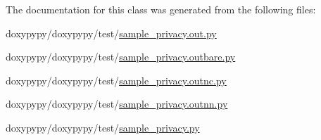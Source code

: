 The documentation for this class was generated from the following files\-:\begin{DoxyCompactItemize}
\item 
doxypypy/doxypypy/test/\hyperlink{sample__privacy_8out_8py}{sample\-\_\-privacy.\-out.\-py}\item 
doxypypy/doxypypy/test/\hyperlink{sample__privacy_8outbare_8py}{sample\-\_\-privacy.\-outbare.\-py}\item 
doxypypy/doxypypy/test/\hyperlink{sample__privacy_8outnc_8py}{sample\-\_\-privacy.\-outnc.\-py}\item 
doxypypy/doxypypy/test/\hyperlink{sample__privacy_8outnn_8py}{sample\-\_\-privacy.\-outnn.\-py}\item 
doxypypy/doxypypy/test/\hyperlink{sample__privacy_8py}{sample\-\_\-privacy.\-py}\end{DoxyCompactItemize}

